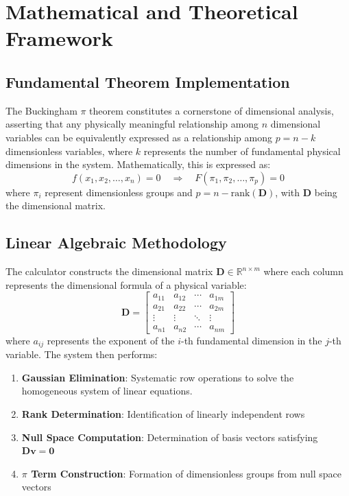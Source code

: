 \documentclass[
	11pt, %
	fleqn, %
	a4paper, %
]{LegrandOrangeBook}
\begin{document}
\section{Mathematical and Theoretical Framework}
\subsection{Fundamental Theorem Implementation}

The Buckingham $\pi$ theorem constitutes a cornerstone of dimensional analysis, asserting that any physically meaningful relationship among $n$ dimensional variables can be equivalently expressed as a relationship among $p = n - k$ dimensionless variables, where $k$ represents the number of fundamental physical dimensions in the system. Mathematically, this is expressed as:
\begin{equation}
f(x_1, x_2, \ldots, x_n) = 0 \quad \Rightarrow \quad F(\pi_1, \pi_2, \ldots, \pi_p) = 0
\end{equation}
where $\pi_i$ represent dimensionless groups and $p = n - \text{rank}(\mathbf{D})$, with $\mathbf{D}$ being the dimensional matrix.

\subsection{Linear Algebraic Methodology}

The calculator constructs the dimensional matrix $\mathbf{D} \in \mathbb{R}^{n \times m}$ where each column represents the dimensional formula of a physical variable:
\begin{equation}
\mathbf{D} = \begin{bmatrix}
a_{11} & a_{12} & \cdots & a_{1m} \\
a_{21} & a_{22} & \cdots & a_{2m} \\
\vdots & \vdots & \ddots & \vdots \\
a_{n1} & a_{n2} & \cdots & a_{nm}
\end{bmatrix}
\end{equation}
where $a_{ij}$ represents the exponent of the $i$-th fundamental dimension in the $j$-th variable. The system then performs:
\begin{enumerate}
    \item \textbf{Gaussian Elimination}: Systematic row operations to solve the homogeneous system of linear equations.
    \item \textbf{Rank Determination}: Identification of linearly independent rows
    \item \textbf{Null Space Computation}: Determination of basis vectors satisfying $\mathbf{D}\mathbf{v} = \mathbf{0}$
    \item \textbf{$\pi$ Term Construction}: Formation of dimensionless groups from null space vectors
\end{enumerate}
\end{document}
